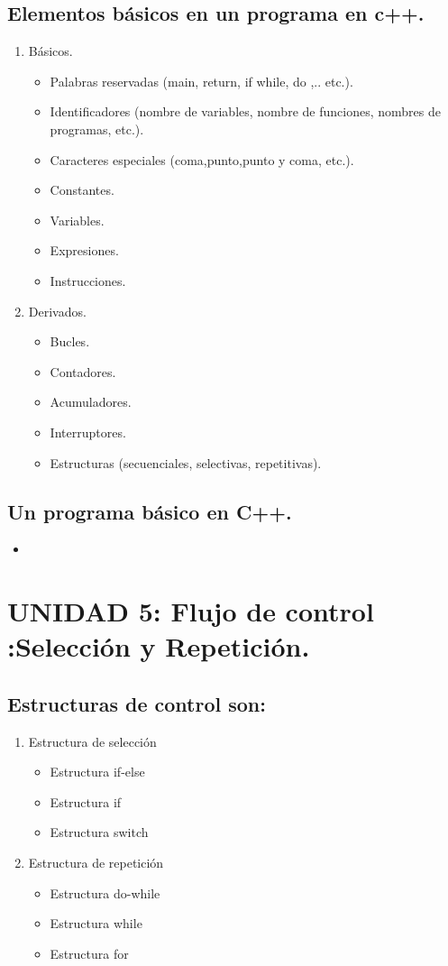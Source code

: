 \documentclass[presentation, aspectratio=54]{beamer}
\begin{document}
\subsection{Elementos básicos en un programa en c++.}
\label{sec:org249ed98}
\begin{enumerate}
\item Básicos.
\label{sec:orge1c5981}
\begin{itemize}
\item Palabras reservadas (main, return, if while, do ,.. etc.).
\item Identificadores (nombre de variables, nombre de funciones, nombres de programas, etc.).
\item Caracteres especiales (coma,punto,punto y coma, etc.).
\item Constantes.
\item Variables.
\item Expresiones.
\item Instrucciones.
\end{itemize}
\item Derivados.
\label{sec:orgd558310}
\begin{itemize}
\item Bucles.
\item Contadores.
\item Acumuladores.
\item Interruptores.
\item Estructuras (secuenciales, selectivas, repetitivas).
\end{itemize}
\end{enumerate}
\subsection{Un programa básico en C++.}
\label{sec:org0915833}
\begin{itemize}
\item 
\end{itemize}
\section{UNIDAD 5: Flujo de control :Selección y Repetición.}
\label{sec:org099c4bc}
\subsection{Estructuras de control son:}
\label{sec:org473605a}
\begin{enumerate}
\item Estructura de selección
\label{sec:org84d59f0}
\begin{itemize}
\item Estructura if-else
\item Estructura if
\item Estructura switch
\end{itemize}
\item Estructura de repetición
\label{sec:orgb3afa37}
\begin{itemize}
\item Estructura do-while
\item Estructura while
\item Estructura for
\end{itemize}
\end{enumerate}
\end{document}
